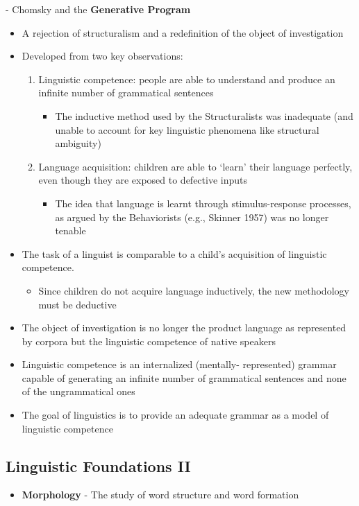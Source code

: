 \documentclass[11pt]{article}
\begin{document}
- Chomsky and the \textbf{Generative Program}
\begin{itemize}
\item A rejection of structuralism and a redefinition of the object of investigation
\item Developed from two key observations:
  \begin{enumerate}
  \item Linguistic competence: people are able to understand and produce an infinite number of grammatical sentences
    \begin{itemize}
    \item The inductive method used by the Structuralists was inadequate (and unable to account for key linguistic phenomena like structural ambiguity)
    \end{itemize}
  \item Language acquisition: children are able to ‘learn’ their language perfectly, even though they are exposed to defective inputs
    \begin{itemize}
    \item The idea that language is learnt through stimulus-response processes, as argued by the Behaviorists (e.g., Skinner 1957) was no longer tenable
    \end{itemize}
  \end{enumerate}
\item The task of a linguist is comparable to a child’s acquisition of linguistic competence.
  \begin{itemize}
  \item Since children do not acquire language inductively, the new methodology must be deductive
  \end{itemize}
\item The object of investigation is no longer the product language as represented by corpora but the linguistic competence of native speakers
\item Linguistic competence is an internalized (mentally- represented) grammar capable of generating an infinite number of grammatical sentences and none of the ungrammatical ones
\item The goal of linguistics is to provide an adequate grammar as a model of linguistic competence
\end{itemize}

\subsection{Linguistic Foundations II}
\begin{itemize}
 \item \textbf{Morphology} - The study of word structure and word formation
\end{itemize}
\end{document}

